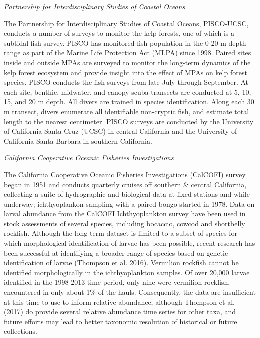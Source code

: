 \documentclass[
  english,
  a4paper,
]{article}
\begin{document}
\emph{Partnership for Interdisciplinary Studies of Coastal Oceans}

The Partnership for Interdisciplinary Studies of Coastal Oceans,
\href{http://www.piscoweb.org/kelp-forest-study}{PISCO-UCSC}, conducts a number of surveys
to monitor the kelp forests, one of which is a subtidal fish survey. PISCO
has monitored fish population in the 0-20 m depth range as part of the
Marine Life Protection Act (MLPA) since 1998. Paired sites inside and outside MPAs
are surveyed to monitor the long-term dynamics of the kelp forest ecosystem and provide
insight into the effect of MPAs on kelp forest species. PISCO conducts the fish
surveys from late July through September. At each site, benthic, midwater, and canopy
scuba transects are conducted at 5, 10, 15, and 20 m depth. All divers are trained
in species identification. Along each 30 m transect, divers enumerate all identifiable
non-cryptic fish, and estimate total length to the nearest centimeter. PISCO surveys
are conducted by the University of California Santa Cruz (UCSC) in central California and the University of California Santa Barbara in southern California.

\emph{California Cooperative Oceanic Fisheries Investigations}

The California Cooperative Oceanic Fisheries Investigations (CalCOFI) survey began in 1951 and conducts quarterly cruises off southern \& central California, collecting a suite of hydrographic and biological data at fixed stations and while underway; ichthyoplankon sampling with a paired bongo started in 1978.
Data on larval abundance from the CalCOFI Ichthyoplankton survey have been used in
stock assessments of several species, including bocaccio, cowcod and shortbelly
rockfish. Although the long-term dataset is limited to a subset of species
for which morphological identification of larvae has been possible, recent research
has been successful at identifying a broader range of species based on genetic
identification of larvae (Thompson et al. 2016).
Vermilion rockfish cannot be identified morphologically in the ichthyoplankton
samples. Of over 20,000 larvae identified in the 1998-2013 time period, only nine
were vermilion rockfish, encountered in only about 1\% of the hauls. Consequently,
the data are insufficient at this time to use to inform relative abundance, although Thompson et al. (2017) do provide several relative abundance time series for other taxa, and
future efforts may lead to better taxonomic resolution of historical or future collections.
\end{document}
